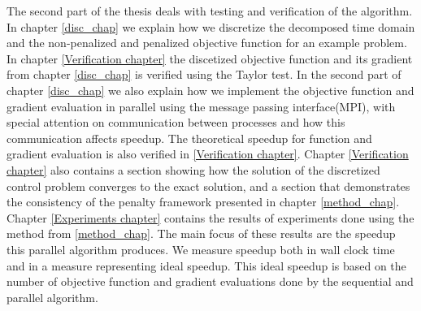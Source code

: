 The second part of the thesis deals with testing and verification of the algorithm. In chapter \ref{disc_chap} we explain how we discretize the decomposed time domain and the non-penalized and penalized objective function for an example problem. In chapter \ref{Verification chapter} the discetized objective function and its gradient from chapter \ref{disc_chap} is verified using the Taylor test. In the second part of chapter \ref{disc_chap} we also explain how we implement the objective function and gradient evaluation in parallel using the message passing interface(MPI), with special attention on communication between processes and how this communication affects speedup. The theoretical speedup for function and gradient evaluation is also verified in \ref{Verification chapter}. Chapter \ref{Verification chapter} also contains a section showing how the solution of the discretized control problem converges to the exact solution, and a section that demonstrates the consistency of the penalty framework presented in chapter \ref{method_chap}. Chapter \ref{Experiments chapter} contains the results of experiments done using the method from \ref{method_chap}. The main focus of these results are the speedup this parallel algorithm produces. We measure speedup both in wall clock time and in a measure representing ideal speedup. This ideal speedup is based on the number of objective function and gradient evaluations done by the sequential and parallel algorithm.
